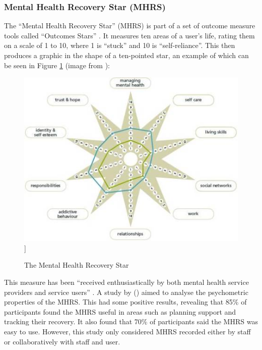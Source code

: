 \documentclass[11pt,openright,a4paper]{report}
\begin{document}
\newpage
\subsubsection{Mental Health Recovery Star (MHRS)}
The \enquote{Mental Health Recovery Star} (MHRS) is part of a set of outcome measure tools called \enquote{Outcomes Stars} \parencite{outcomesstars}. It measures ten areas of a user's life, rating them on a scale of 1 to 10, where 1 is \enquote{stuck} and 10 is \enquote{self-reliance}. This then produces a graphic in the shape of a ten-pointed star, an example of which can be seen in Figure \ref{fig:mhrs} (image from \parencite{outcomesstars}):

\begin{figure}[ht]
\centering
\caption{The Mental Health Recovery Star}
\includegraphics[width=\textwidth]{i/recoverystar.jpg}]
\label{fig:mhrs}
\end{figure}

This measure has been \enquote{received enthusiastically by both
mental health service providers and service users} \parencite{dickens2012recovery}. A study by \citeauthor{killaspy2012psychometric} (\citeyear{killaspy2012psychometric}) aimed to analyse the psychometric properties of the MHRS. This had some positive results, revealing that 85\% of participants found the MHRS useful in areas such as planning support and tracking their recovery. It also found that 70\% of participants said the MHRS was easy to use. However, this study only considered MHRS recorded either by staff or collaboratively with staff and user.
\end{document}
